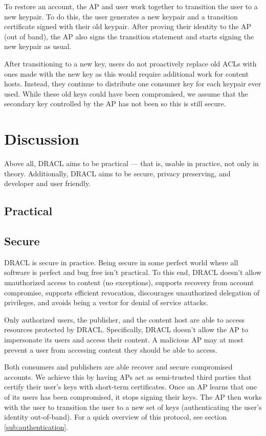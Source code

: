 \documentclass[pdftex,12pt,a4papaer]{report}
\begin{document}
To restore an account, the AP and user work together to transition the user to a
new keypair. To do this, the user generates a new keypair and a transition
certificate signed with their old keypair. After proving their identity to the
AP (out of band), the AP also signs the transition statement and starts signing
the new keypair as usual.

After transitioning to a new key, users do not proactively replace old ACLs with
ones made with the new key as this would require additional work for content
hosts. Instead, they continue to distribute one consumer key for each keypair
ever used. While these old keys could have been compromised, we assume that the
secondary key controlled by the AP has not been so this is still secure.

\chapter{Discussion}

Above all, DRACL aims to be practical --- that is, usable in practice, not only
in theory. Additionally, DRACL aims to be secure, privacy preserving, and
developer and user friendly.

\section{Practical}


\section{Secure}
\label{sub:secure}

DRACL is secure in practice. Being secure in some perfect world where all
software is perfect and bug free isn't practical. To this end, DRACL doesn't
allow unauthorized access to content (no exceptions), supports recovery from
account compromise, supports efficient revocation, discourages unauthorized
delegation of privileges, and avoids being a vector for denial of service
attacks.

Only authorized users, the publisher, and the content host are able to
access resources protected by DRACL\@. Specifically, DRACL doesn't allow the AP
to impersonate its users and access their content. A malicious AP may at most
prevent a user from accessing content they should be able to access.

Both consumers and publishers are able recover and secure compromised
accounts. We achieve this by having APs act as semi-trusted third parties that
certify their user's keys with short-term certificates. Once an AP learns that
one of its users has been compromised, it stops signing their keys. The AP then
works with the user to transition the user to a new set of keys (authenticating
the user's identity out-of-band). For a quick overview of this protocol, see
section \ref{sub:authentication}.
\end{document}
